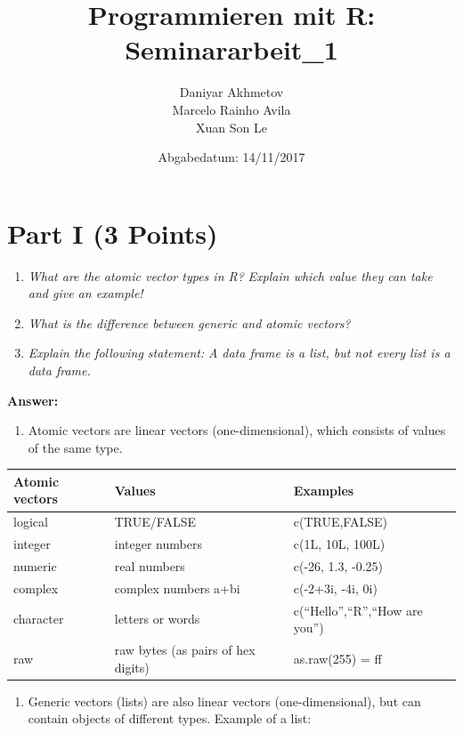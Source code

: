 \documentclass[12,]{article}
\title{Programmieren mit R: Seminararbeit\_1}
\author{Daniyar Akhmetov \\ Marcelo Rainho Avila \\ Xuan Son Le}
\date{Abgabedatum: 14/11/2017}
\providecommand{\tightlist}{%
  \setlength{\itemsep}{0pt}\setlength{\parskip}{0pt}}
\begin{document}
\maketitle

{
\setcounter{tocdepth}{2}
\tableofcontents
}
\section{Part I (3 Points)}\label{part-i-3-points}

\begin{enumerate}
\def\labelenumi{\arabic{enumi}.}
\tightlist
\item
  \emph{What are the atomic vector types in R?} \emph{Explain which
  value they can take and give an example!}
\item
  \emph{What is the difference between generic and atomic vectors?}
\item
  \emph{Explain the following statement:} \emph{A data frame is a list,
  but not every list is a data frame.}
\end{enumerate}

\textbf{Answer:}

\begin{enumerate}
\def\labelenumi{\arabic{enumi}.}
\tightlist
\item
  Atomic vectors are linear vectors (one-dimensional), which consists of
  values of the same type.
\end{enumerate}

\begin{longtable}[]{@{}lll@{}}
\toprule
\textbf{Atomic vectors} & \textbf{Values} &
\textbf{Examples}\tabularnewline
\midrule
\endhead
logical & TRUE/FALSE & c(TRUE,FALSE)\tabularnewline
integer & integer numbers & c(1L, 10L, 100L)\tabularnewline
numeric & real numbers & c(-26, 1.3, -0.25)\tabularnewline
complex & complex numbers a+bi & c(-2+3i, -4i, 0i)\tabularnewline
character & letters or words & c(``Hello'',``R'',``How are
you'')\tabularnewline
raw & raw bytes (as pairs of hex digits) & as.raw(255) =
ff\tabularnewline
\bottomrule
\end{longtable}

\begin{enumerate}
\def\labelenumi{\arabic{enumi}.}
\setcounter{enumi}{1}
\tightlist
\item
  Generic vectors (lists) are also linear vectors (one-dimensional), but
  can contain objects of different types. Example of a list:
\end{enumerate}
\end{document}
